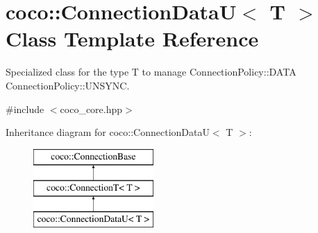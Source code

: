 \hypertarget{classcoco_1_1_connection_data_u}{}\section{coco\+:\+:Connection\+Data\+U$<$ T $>$ Class Template Reference}
\label{classcoco_1_1_connection_data_u}


Specialized class for the type T to manage Connection\+Policy\+::\+D\+A\+T\+A Connection\+Policy\+::\+U\+N\+S\+Y\+N\+C.  




{\ttfamily \#include $<$coco\+\_\+core.\+hpp$>$}

Inheritance diagram for coco\+:\+:Connection\+Data\+U$<$ T $>$\+:\begin{figure}[H]
\begin{center}
\leavevmode
\includegraphics[height=3.000000cm]{classcoco_1_1_connection_data_u}
\end{center}
\end{figure}
